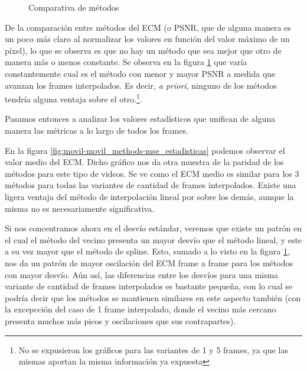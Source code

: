 \begin{figure}[H]
    \centering
    \caption{Comparativa de m\'etodos}
    \label{fig:movil-movil_metodos}
\end{figure}

\par De la comparaci\'on entre m\'etodos del ECM (o PSNR, que de alguna manera
es un poco m\'as claro al normalizar los valores en funci\'on del valor m\'aximo
de un p\'ixel), lo que se observa es que no hay un m\'etodo que sea mejor que
otro de manera m\'as o menos constante. Se observa en la figura
\ref{fig:movil-movil_metodos} que var\'ia constantemente cual es el m\'etodo
con menor y mayor PSNR a medida que avanzan los frames interpolados. Es decir,
\emph{a priori}, ninguno de los m\'etodos tendr\'ia alguna ventaja sobre el
otro.\footnote{No se expusieron los gr\'aficos para las variantes de 1 y 5
frames, ya que las mismas aportan la misma informaci\'on ya expuesta}.

\par Pasamos entonces a analizar los valores estad\'isticos que unifican de alguna
manera las m\'etricas a lo largo de todos los frames.

\par En la figura \ref{fig:movil-movil_methods-mse_estadisticas} podemos observar
el valor medio del ECM. Dicho gr\'afico nos da otra muestra de la paridad de
los m\'etodos para este tipo de videos. Se ve como el ECM medio es similar para
los 3 m\'etodos para todas las variantes de cantidad de frames interpolados.
Existe una ligera ventaja del m\'etodo de interpolaci\'on lineal por sobre los
dem\'as, aunque la misma no es necesariamente significativa.

\par Si nos concentramos ahora en el desv\'io est\'andar, veremos que existe
un patr\'on en el cual el m\'etodo del vecino presenta un mayor desv\'io que
el m\'etodo lineal, y este a su vez mayor que el m\'etodo de spline. Esto, sumado
a lo visto en la figura \ref{fig:movil-movil_metodos}, nos da un patr\'on de
mayor oscilaci\'on del ECM frame a frame para los m\'etodos con mayor desv\'io.
A\'un as\'i, las diferencias entre los desv\'ios para una misma variante de
cantidad de frames interpolados es bastante peque\~na, con lo cual se podr\'ia
decir que los m\'etodos se mantienen similares en este aspecto tambi\'en (con
la excepcci\'on del caso de 1 frame interpolado, donde el vecino m\'as cercano
presenta muchos m\'as picos y oscilaciones que sus contrapartes).

